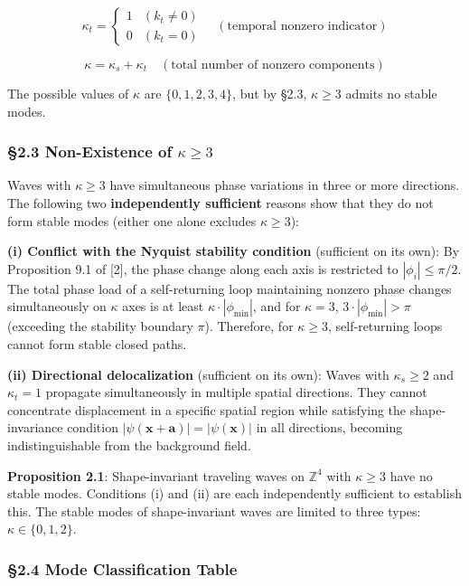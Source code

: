 \documentclass[
  a4paper,11pt]{article}
\theoremstyle{definition}
\theoremstyle{remark}
\begin{document}
\[\kappa_t = \begin{cases} 1 & (k_t \neq 0) \\ 0 & (k_t = 0) \end{cases} \quad (\text{temporal nonzero indicator})\]

\[\kappa = \kappa_s + \kappa_t \quad (\text{total number of nonzero components})\]

The possible values of \(\kappa\) are \(\{0, 1, 2, 3, 4\}\), but by
§2.3, \(\kappa \geq 3\) admits no stable modes.

\subsubsection{\texorpdfstring{§2.3 Non-Existence of
\(\kappa \geq 3\)}{§2.3 Non-Existence of \textbackslash kappa \textbackslash geq 3}}\label{non-existence-of-kappa-geq-3}

Waves with \(\kappa \geq 3\) have simultaneous phase variations in three
or more directions. The following two \textbf{independently sufficient}
reasons show that they do not form stable modes (either one alone
excludes \(\kappa \geq 3\)):

\textbf{(i) Conflict with the Nyquist stability condition} (sufficient
on its own): By Proposition 9.1 of {[}2{]}, the phase change along each
axis is restricted to \(|\phi_i| \leq \pi/2\). The total phase load of a
self-returning loop maintaining nonzero phase changes simultaneously on
\(\kappa\) axes is at least \(\kappa \cdot |\phi_{\min}|\), and for
\(\kappa = 3\), \(3 \cdot |\phi_{\min}| > \pi\) (exceeding the stability
boundary \(\pi\)). Therefore, for \(\kappa \geq 3\), self-returning
loops cannot form stable closed paths.

\textbf{(ii) Directional delocalization} (sufficient on its own): Waves
with \(\kappa_s \geq 2\) and \(\kappa_t = 1\) propagate simultaneously
in multiple spatial directions. They cannot concentrate displacement in
a specific spatial region while satisfying the shape-invariance
condition \(|\psi(\mathbf{x} + \mathbf{a})| = |\psi(\mathbf{x})|\) in
all directions, becoming indistinguishable from the background field.

\textbf{Proposition 2.1}: Shape-invariant traveling waves on
\(\mathbb{Z}^4\) with \(\kappa \geq 3\) have no stable modes. Conditions
(i) and (ii) are each independently sufficient to establish this. The
stable modes of shape-invariant waves are limited to three types:
\(\kappa \in \{0, 1, 2\}\).

\subsubsection{§2.4 Mode Classification
Table}\label{mode-classification-table}
\end{document}

